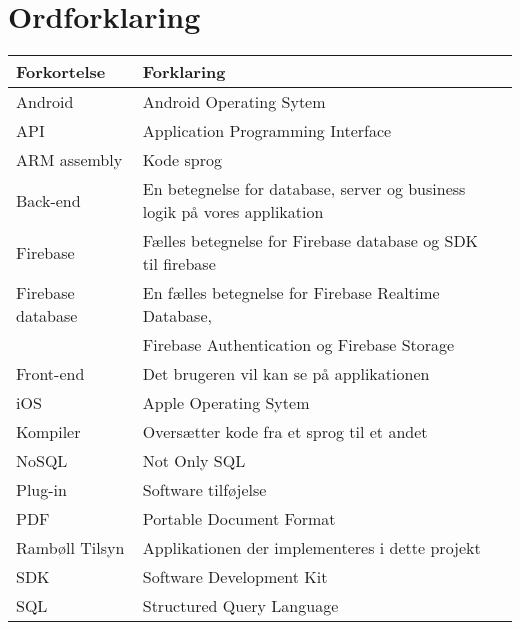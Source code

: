 \chapter*{Ordforklaring}

\begin{tabularx}{\textwidth}{l l X} \hline
	\textbf{Forkortelse}  & \textbf{Forklaring} \\ \hline
	Android& Android Operating Sytem \\
	API& Application Programming Interface \\
	ARM assembly& Kode sprog \\
	Back-end& En betegnelse for database, server og business logik på vores applikation \\
	Firebase& Fælles betegnelse for Firebase database og SDK til firebase\\
	Firebase database& En fælles betegnelse for Firebase Realtime Database,\\
	& Firebase Authentication og Firebase Storage \\
	Front-end& Det brugeren vil kan se på applikationen \\
	iOS&  Apple Operating Sytem \\
	Kompiler& Oversætter kode fra et sprog til et andet \\
	NoSQL & Not Only SQL \\
	Plug-in&  Software tilføjelse \\
	PDF& Portable Document Format \\
	Rambøll Tilsyn& Applikationen der implementeres i dette projekt\\
	SDK& Software Development Kit\\
	SQL&  Structured Query Language \\
	
\end{tabularx}
